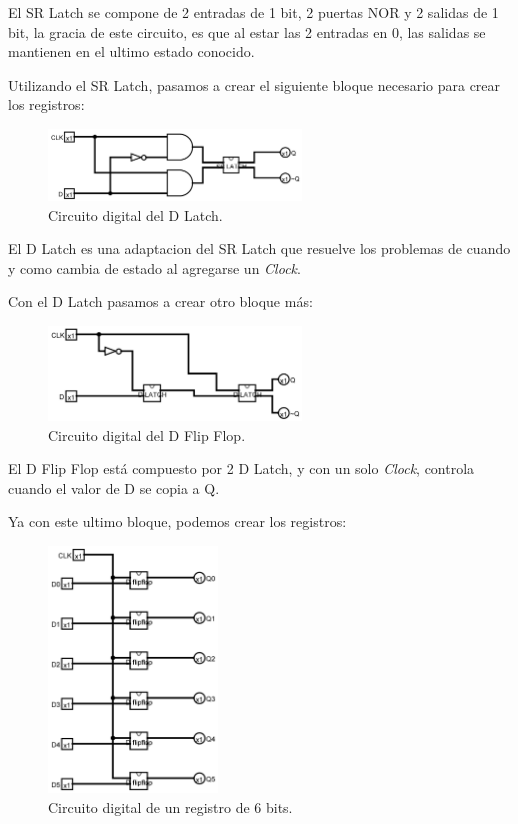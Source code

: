 \documentclass[a4paper]{article}
\begin{document}
El SR Latch se compone de 2 entradas de 1 bit, 2 puertas NOR y 2 salidas de 1 bit, la gracia de este circuito, es que al estar las 2 entradas en 0, las salidas se mantienen  en el ultimo estado conocido.

Utilizando el SR Latch, pasamos a crear el siguiente bloque necesario para crear los registros:

\begin{figure}[!htbp]
    \centering
    \includegraphics[width=0.6\textwidth]{D Latch.jpg}
    \caption{Circuito digital del D Latch.}
    \label{fig:DLatch}
\end{figure}

El D Latch es una adaptacion del SR Latch que resuelve los problemas de cuando y como cambia de estado al agregarse un \textit{Clock}.

Con el D Latch pasamos a crear otro bloque más:

\begin{figure}[!htbp]
    \centering
    \includegraphics[width=0.6\textwidth]{D Flip Flop.jpg}
    \caption{Circuito digital del D Flip Flop.}
    \label{fig:DFlipFlop}
\end{figure}

El D Flip Flop está compuesto por 2 D Latch, y con un solo \textit{Clock}, controla cuando el valor de D se copia a Q.

Ya con este ultimo bloque, podemos crear los registros:

\newpage

\begin{figure}[!htbp]
    \centering
    \includegraphics[width=0.4\textwidth]{6-bit Register.jpg}
    \caption{Circuito digital de un registro de 6 bits.}
    \label{fig:6bitRegister}
\end{figure}
\end{document}
